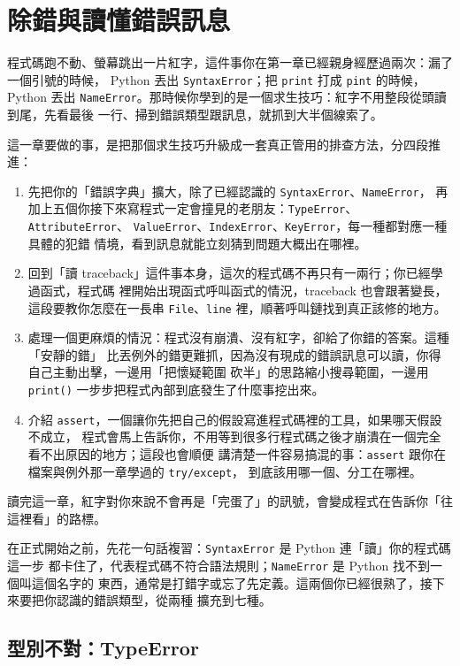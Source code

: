\chapter{除錯與讀懂錯誤訊息}
\label{ch:debugging}

程式碼跑不動、螢幕跳出一片紅字，這件事你在第一章已經親身經歷過兩次：漏了一個引號的時候，
Python 丟出 \texttt{SyntaxError}；把 \texttt{print} 打成 \texttt{pint} 的時候，Python
丟出 \texttt{NameError}。那時候你學到的是一個求生技巧：紅字不用整段從頭讀到尾，先看最後
一行、掃到錯誤類型跟訊息，就抓到大半個線索了。

這一章要做的事，是把那個求生技巧升級成一套真正管用的排查方法，分四段推進：

\begin{enumerate}
\item 先把你的「錯誤字典」擴大，除了已經認識的 \texttt{SyntaxError}、\texttt{NameError}，
再加上五個你接下來寫程式一定會撞見的老朋友：\texttt{TypeError}、\texttt{AttributeError}、
\texttt{ValueError}、\texttt{IndexError}、\texttt{KeyError}，每一種都對應一種具體的犯錯
情境，看到訊息就能立刻猜到問題大概出在哪裡。
\item 回到「讀 traceback」這件事本身，這次的程式碼不再只有一兩行；你已經學過函式，程式碼
裡開始出現函式呼叫函式的情況，traceback 也會跟著變長，這段要教你怎麼在一長串
\texttt{File}、\texttt{line} 裡，順著呼叫鏈找到真正該修的地方。
\item 處理一個更麻煩的情況：程式沒有崩潰、沒有紅字，卻給了你錯的答案。這種「安靜的錯」
比丟例外的錯更難抓，因為沒有現成的錯誤訊息可以讀，你得自己主動出擊，一邊用「把懷疑範圍
砍半」的思路縮小搜尋範圍，一邊用 \texttt{print()} 一步步把程式內部到底發生了什麼事挖出來。
\item 介紹 \texttt{assert}，一個讓你先把自己的假設寫進程式碼裡的工具，如果哪天假設不成立，
程式會馬上告訴你，不用等到很多行程式碼之後才崩潰在一個完全看不出原因的地方；這段也會順便
講清楚一件容易搞混的事：\texttt{assert} 跟你在檔案與例外那一章學過的 \texttt{try/except}，
到底該用哪一個、分工在哪裡。
\end{enumerate}

讀完這一章，紅字對你來說不會再是「完蛋了」的訊號，會變成程式在告訴你「往這裡看」的路標。

在正式開始之前，先花一句話複習：\texttt{SyntaxError} 是 Python 連「讀」你的程式碼這一步
都卡住了，代表程式碼不符合語法規則；\texttt{NameError} 是 Python 找不到一個叫這個名字的
東西，通常是打錯字或忘了先定義。這兩個你已經很熟了，接下來要把你認識的錯誤類型，從兩種
擴充到七種。

\section{型別不對：TypeError}
\label{sec:type-error}

